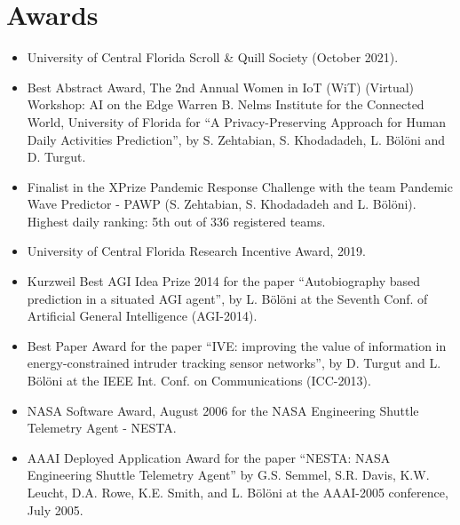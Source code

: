 
\section{Awards}

\begin{itemize}[nosep, noitemsep]

    \item University of Central Florida Scroll \& Quill Society (October 2021).
    
    \item Best Abstract Award, The 2nd Annual Women in IoT (WiT) (Virtual) Workshop: AI on the Edge Warren B. Nelms Institute for the Connected World, University of Florida for ``A Privacy-Preserving Approach for Human Daily Activities Prediction'', by S. Zehtabian, S. Khodadadeh, L. Bölöni and D. Turgut. 
    
    \item Finalist in the XPrize Pandemic Response Challenge with the team Pandemic Wave Predictor - PAWP (S. Zehtabian, S. Khodadadeh and L. Bölöni). Highest daily ranking: 5th out of 336 registered teams.
    
    \item University of Central Florida Research Incentive Award, 2019.
    
    \item Kurzweil Best AGI Idea Prize 2014 for the paper ``Autobiography based prediction in a situated AGI agent'', by L. Bölöni at the Seventh Conf. of Artificial General Intelligence (AGI-2014).
    
    \item Best Paper Award for the paper ``IVE: improving the value of information in energy-constrained intruder tracking sensor networks'', by D. Turgut and L. Bölöni at the IEEE Int. Conf. on Communications (ICC-2013).
    
    \item NASA Software Award, August 2006 for the NASA Engineering Shuttle Telemetry Agent - NESTA.
    
    \item AAAI Deployed Application Award for the paper ``NESTA: NASA Engineering Shuttle Telemetry Agent'' by G.S. Semmel, S.R. Davis, K.W. Leucht, D.A. Rowe, K.E. Smith, and L. Bölöni at the AAAI-2005 conference, July 2005.
    

\end{itemize}

